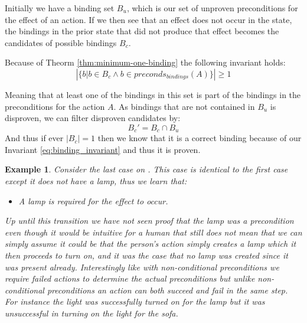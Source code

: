 \documentclass[../Master.tex]{subfiles}
\begin{document}
Initially we have a binding set $B_u$, which is our set of unproven preconditions for the effect of an action. 
If we then see that an effect does not occur in the state, the bindings in the prior state that did not produce that effect becomes the candidates of possible bindings $B_c$. 

Because of Theorm \ref{thm:minimum-one-binding} the following invariant holds:
\begin{equation} \label{eq:binding_invariant}
\left| \{b  |  b \in B_c \land b \in preconds_{bindings}(A)\} \right|  \ge 1
\end{equation}


Meaning that at least one of the bindings in this set is part of the bindings in the preconditions for the action $A$. As bindings that are not contained in $B_u$ is disproven, we can filter disproven candidates by:
\begin{equation}
B_c' = B_c \cap B_u
\end{equation}
And thus if ever $|B_c| = 1$ then we know that it is a correct binding because of our Invariant \ref{eq:binding_invariant} and thus it is proven.

 \newtheorem{thm-house-example-3}{Example}[section]
 \begin{thm-house-example-3}\label{thm:house-example-3}
 Consider the last case on . This case is identical
to the first case except it does not have a lamp, thus we learn that:
\begin{itemize}
	\item A lamp is required for the effect to occur.
\end{itemize}
Up until this transition we have not seen proof that the lamp was a precondition even though it would be intuitive for a human that still
does not mean that we can simply assume it could be that the person's action simply creates a
lamp which it then proceeds to turn on, and it was the case that no
lamp was created since it was present already.
Interestingly like with non-conditional preconditions we require failed actions to determine the actual preconditions but unlike non-conditional preconditions an action can both succeed and fail in the same step. For instance the light was successfully turned on for the lamp but it was unsuccessful in turning on the light for the sofa. 

\end{thm-house-example-3}
\end{document}
